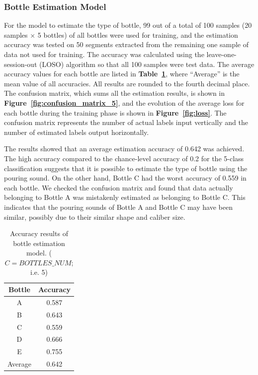 \documentclass[sigconf,authordraft]{acmart}
\newcommand\figref[1]{\textbf{Figure~\ref{fig:#1}}}
\newcommand\tabref[1]{\textbf{Table~\ref{tab:#1}}}
\begin{document}
\subsubsection{Bottle Estimation Model}
For the model to estimate the type of bottle, 99 out of a total of 100 samples (20 samples $\times$ 5 bottles) of all bottles were used for training, and the estimation accuracy was tested on 50 segments extracted from the remaining one sample of data not used for training. The accuracy was calculated using the leave-one-session-out (LOSO) algorithm so that all 100 samples were test data. The average accuracy values for each bottle are listed in \tabref{result_5}, where ``Average'' is the mean value of all accuracies. All results are rounded to the fourth decimal place. The confusion matrix, which sums all the estimation results, is shown in \figref{confusion_matrix_5}, and the evolution of the average loss for each bottle during the training phase is shown in \figref{loss}. The confusion matrix represents the number of actual labels input vertically and the number of estimated labels output horizontally.\par

The results showed that an average estimation accuracy of 0.642 was achieved. The high accuracy compared to the chance-level accuracy of 0.2 for the 5-class classification suggests that it is possible to estimate the type of bottle using the pouring sound. On the other hand, Bottle C had the worst accuracy of 0.559 in each bottle. We checked the confusion matrix and found that data actually belonging to Bottle A was mistakenly estimated as belonging to Bottle C. This indicates that the pouring sounds of Bottle A and Bottle C may have been similar, possibly due to their similar shape and caliber size.

\begin{table}[!t]
  \centering
  \caption{Accuracy results of bottle estimation model. ($C=BOTTLES\_NUM$; i.e. 5)}
  \begin{tabular}{c|c} \hline\hline
    Bottle & Accuracy \\ \hline
    A & 0.587 \\
    B & 0.643 \\
    C & 0.559 \\
    D & 0.666 \\
    E & 0.755 \\ \hline
    Average & 0.642 \\ \hline
  \end{tabular}
  \label{tab:result_5}
\end{table}
\end{document}
